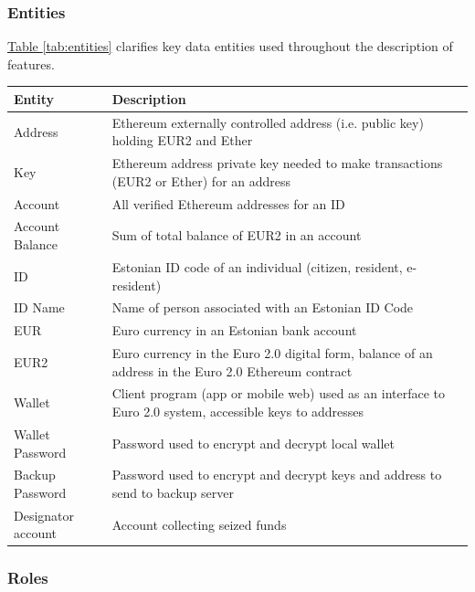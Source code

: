\documentclass[a4paper,12pt]{article} %
\newcommand{\hypertableref}[1]{\hyperref[#1]{Table \ref{#1}}}
\begin{document}
{{\subsubsection{Entities} \label{sssec:3.3:entities}

\hypertableref{tab:entities} clarifies key data entities used throughout the description of features.

\begin{center}
\begin{tabular}{ | p{3cm} | p{12cm} | }
 \hline
 Entity & Description
 \\ \hline\hline
 Address & Ethereum externally controlled address (i.e. public key) holding EUR2 and Ether
 \\ \hline
 Key & Ethereum address private key needed to make transactions (EUR2 or Ether) for an address
 \\ \hline
 Account & All verified Ethereum addresses for an ID
 \\ \hline
 Account Balance & Sum of total balance of EUR2 in an account
 \\ \hline
 ID & Estonian ID code of an individual (citizen, resident, e-resident)
 \\ \hline
 ID Name & Name of person associated with an Estonian ID Code
 \\ \hline
 EUR & Euro currency in an Estonian bank account
 \\ \hline
 EUR2 & Euro currency in the Euro 2.0 digital form, balance of an address in the Euro 2.0 Ethereum contract
 \\ \hline
 Wallet & Client program (app or mobile web) used as an interface to Euro 2.0 system, accessible keys to addresses
 \\ \hline
 Wallet Password & Password used to encrypt and decrypt local wallet
 \\ \hline
 Backup Password & Password used to encrypt and decrypt keys and address to send to backup server
 \\ \hline
 Designator account & Account collecting seized funds
 \\ \hline
\end{tabular}
\end{center}
\label{tab:entities}

\subsubsection{Roles} \label{sssec:3.3:roles}

}}
\end{document}

